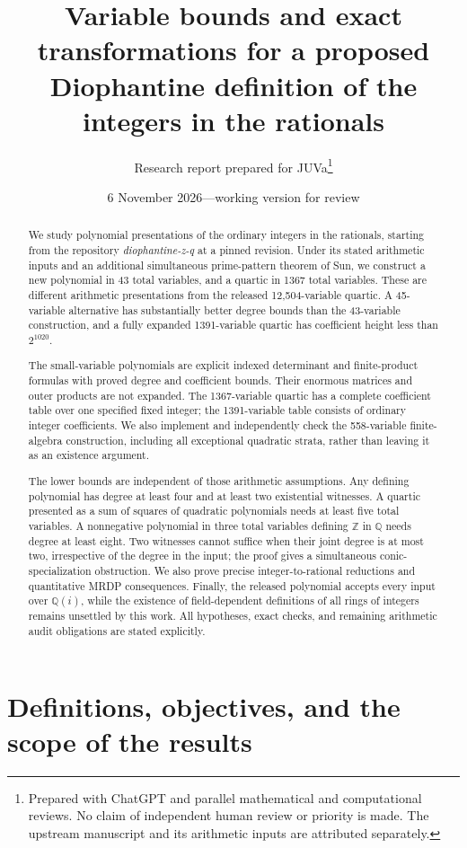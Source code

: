 \documentclass[11pt]{article}
\title{Variable bounds and exact transformations for a proposed\newline
Diophantine definition of the integers in the rationals}
\author{Research report prepared for JUVa\thanks{Prepared with ChatGPT and
parallel mathematical and computational reviews. No claim of independent
human review or priority is made. The upstream manuscript and its arithmetic
inputs are attributed separately.}}
\date{6 November 2026\quad---\quad working version for review}
\theoremstyle{definition}
\newcommand{\Q}{\mathbb Q}
\begin{document}
\maketitle
\begin{abstract}
We study polynomial presentations of the ordinary integers in the
rationals, starting from the repository \emph{diophantine-z-q} at a pinned
revision. Under its stated arithmetic inputs and an additional
simultaneous prime-pattern theorem of Sun, we construct a new polynomial
in 43 total variables, and a quartic in 1367 total variables. These are
different arithmetic presentations from the released 12,504-variable
quartic. A 45-variable alternative has substantially better degree bounds
than the 43-variable construction, and a fully expanded 1391-variable
quartic has coefficient height less than $2^{1020}$.

The small-variable polynomials are explicit indexed determinant and
finite-product formulas with proved degree and coefficient bounds.
Their enormous matrices and outer products are not expanded. The
1367-variable quartic has a complete coefficient table over one specified
fixed integer; the 1391-variable table consists of ordinary integer
coefficients. We also implement and independently check the
558-variable finite-algebra construction, including all exceptional
quadratic strata, rather than leaving it as an existence argument.

The lower bounds are independent of those arithmetic assumptions.
Any defining polynomial has degree at least four and at least two
existential witnesses. A quartic presented as a sum of squares of
quadratic polynomials needs at least five total variables. A nonnegative
polynomial in three total variables defining $\mathbb Z$ in $\mathbb Q$
needs degree at least eight.
Two witnesses cannot suffice when their joint degree is at most two,
irrespective of the degree in the input; the proof gives a simultaneous
conic-specialization obstruction. We also prove precise integer-to-rational
reductions and quantitative MRDP consequences. Finally, the released
polynomial accepts every input over $\Q(i)$, while the existence of
field-dependent definitions of all rings of integers remains unsettled
by this work. All hypotheses, exact checks, and remaining arithmetic
audit obligations are stated explicitly.
\end{abstract}
\tableofcontents

\section{Definitions, objectives, and the scope of the results}
\label{sec:scope}
\end{document}
